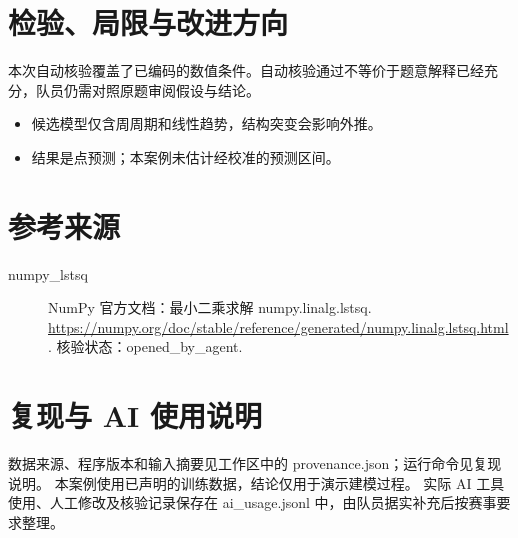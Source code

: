\documentclass[UTF8,a4paper,11pt,fontset=fandol]{ctexart}
\begin{document}
\section{检验、局限与改进方向}
本次自动核验覆盖了已编码的数值条件。自动核验通过不等价于题意解释已经充分，队员仍需对照原题审阅假设与结论。
\begin{itemize}

\item 候选模型仅含周周期和线性趋势，结构突变会影响外推。

\item 结果是点预测；本案例未估计经校准的预测区间。

\end{itemize}

\section*{参考来源}

\begin{description}

\item[numpy\_lstsq] NumPy 官方文档：最小二乘求解 numpy.linalg.lstsq. \url{https://numpy.org/doc/stable/reference/generated/numpy.linalg.lstsq.html}. 核验状态：opened\_by\_agent.

\end{description}

\section*{复现与 AI 使用说明}
数据来源、程序版本和输入摘要见工作区中的 provenance.json；运行命令见复现说明。
本案例使用已声明的训练数据，结论仅用于演示建模过程。
实际 AI 工具使用、人工修改及核验记录保存在 ai\_usage.jsonl 中，由队员据实补充后按赛事要求整理。
\end{document}
